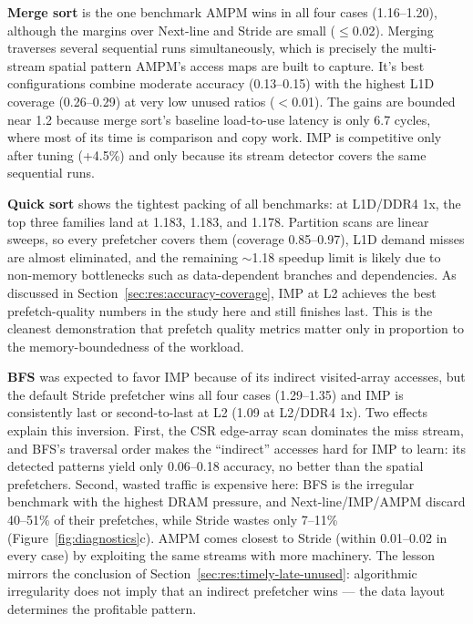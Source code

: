\documentclass[12pt, letterpaper]{article}
\begin{document}
\noindent\textbf{Merge sort} is the one benchmark AMPM wins in all four cases (1.16--1.20), although the margins over Next-line and Stride are small ($\le$0.02). Merging traverses several sequential runs simultaneously, which is precisely the multi-stream spatial pattern AMPM's access maps are built to capture. It's best configurations combine moderate accuracy (0.13--0.15) with the highest L1D coverage (0.26--0.29) at very low unused ratios ($<$0.01). The gains are bounded near 1.2 because merge sort's baseline load-to-use latency is only 6.7 cycles, where most of its time is comparison and copy work. IMP is competitive only after tuning (+4.5\%) and only because its stream detector covers the same sequential runs.

\noindent\textbf{Quick sort} shows the tightest packing of all benchmarks: at L1D/DDR4 1x, the top three families land at 1.183, 1.183, and 1.178. Partition scans are linear sweeps, so every prefetcher covers them (coverage 0.85--0.97), L1D demand misses are almost eliminated, and the remaining $\sim$1.18 speedup limit is likely due to non-memory bottlenecks such as data-dependent branches and dependencies. As discussed in Section~\ref{sec:res:accuracy-coverage}, IMP at L2 achieves the best prefetch-quality numbers in the study here and still finishes last. This is the cleanest demonstration that prefetch quality metrics matter only in proportion to the memory-boundedness of the workload.

\noindent\textbf{BFS} was expected to favor IMP because of its indirect visited-array accesses, but the default Stride prefetcher wins all four cases (1.29--1.35) and IMP is consistently last or second-to-last at L2 (1.09 at L2/DDR4 1x). Two effects explain this inversion. First, the CSR edge-array scan dominates the miss stream, and BFS's traversal order makes the ``indirect'' accesses hard for IMP to learn: its detected patterns yield only 0.06--0.18 accuracy, no better than the spatial prefetchers. Second, wasted traffic is expensive here: BFS is the irregular benchmark with the highest DRAM pressure, and Next-line/IMP/AMPM discard 40--51\% of their prefetches, while Stride wastes only 7--11\% (Figure~\ref{fig:diagnostics}c). AMPM comes closest to Stride (within 0.01--0.02 in every case) by exploiting the same streams with more machinery. The lesson mirrors the conclusion of Section~\ref{sec:res:timely-late-unused}: algorithmic irregularity does not imply that an indirect prefetcher wins --- the data layout determines the profitable pattern.
\end{document}
